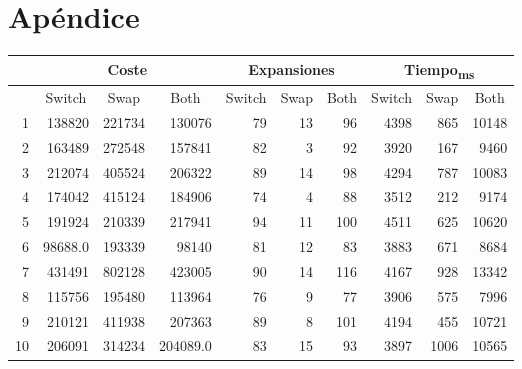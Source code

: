 \documentclass{article}
\begin{document}
\section{Apéndice}
  \begin{center}
    \begin{tabular}{ | r | r | r | r | r | r | r | r | r | r | }
      \hline
      \rowcolor{DarkGrey}
      & \multicolumn{3}{|c|}{Coste} & \multicolumn{3}{c|}{Expansiones} & \multicolumn{3}{|c|}{Tiempo\textsubscript{ms}} \\ \hline
      \rowcolor{DarkGrey}
      \multicolumn{1}{|c|}{Réplica} & \multicolumn{1}{|c|}{Switch} & \multicolumn{1}{|c|}{Swap} & \multicolumn{1}{|c|}{Both} & \multicolumn{1}{|c|}{Switch} & \multicolumn{1}{|c|}{Swap} & \multicolumn{1}{|c|}{Both} & \multicolumn{1}{|c|}{Switch} & \multicolumn{1}{|c|}{Swap} & \multicolumn{1}{|c|}{Both} \\ \hline \hline
      1 & 138820 & 221734 & 130076 & 79 & 13 & 96 & 4398 & 865 & 10148 \\ \hline
      \rowcolor{LightGrey}
      2 & 163489 & 272548 & 157841 & 82 & 3 & 92 & 3920 & 167 & 9460 \\ \hline
      3 & 212074 & 405524 & 206322 & 89 & 14 & 98 & 4294 & 787 & 10083 \\ \hline
      \rowcolor{LightGrey}
      4 & 174042 & 415124 & 184906 & 74 & 4 & 88 & 3512 & 212 & 9174 \\ \hline
      5 & 191924 & 210339 & 217941 & 94 & 11 & 100 & 4511 & 625 & 10620 \\ \hline
      \rowcolor{LightGrey}
      6 & 98688.0 & 193339 & 98140 & 81 & 12 & 83 & 3883 & 671 & 8684 \\ \hline
      7 & 431491 & 802128 & 423005 & 90 & 14 & 116 & 4167 & 928 & 13342 \\ \hline
      \rowcolor{LightGrey}
      8 & 115756 & 195480 & 113964 & 76 & 9 & 77 & 3906 & 575 & 7996 \\ \hline
      9 & 210121 & 411938 & 207363 & 89 & 8 & 101 & 4194 & 455 & 10721 \\ \hline
      \rowcolor{LightGrey}
      10 & 206091 & 314234 & 204089.0 & 83 & 15 & 93 & 3897 & 1006 & 10565 \\ \hline
    \end{tabular}
    \label{table:T1}
  \end{center}
\end{document}
